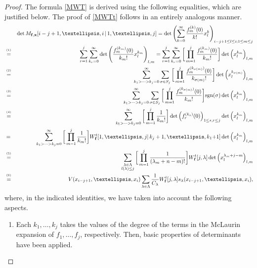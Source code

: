 \documentclass[10pt,a4paper]{amsart}
\begin{document}
\begin{proof}
The formula \eqref{MWT} is derived using the following equalities, which are justified below. The proof of \eqref{MWTt} follows  in an entirely analogous manner. 
    \begin{eqnarray*}
    &&\det M_{\bf f, \bf x}{[i-j+1,\dots,i\,|\,1,\dots, j]} =\det \left( \sum_{k=0}^\infty \frac{f_m^{(k)}(0)}{k!}x_l^{k}\right)_{i-j+1 \le l \le i; 1\le m \le j} \nonumber \\%
    &\stackrel{^{(1)}}{=}&{  \sum_{r=1}^j \sum_{k_r=0}^\infty \det\left(  \frac{f_m^{(k_m)}(0)}{k_m!}x_l^{k_m}\right)_{l,m}
    =\sum_{r=1}^j \sum_{k_r=0}^\infty   \bigg[\prod_{m=1}^j \frac{f_m^{(k_m)}(0)}{k_m!}\bigg]\det\left( x_l^{k_m}\right)_{l,m} }\\
    &\stackrel{^{(2)}}{=}&   \sum_{k_1>\cdots> k_j=0}^\infty \sum_{\sigma\in S_j} \bigg[\prod_{m=1}^j \frac{f_{m}^{(k_{\sigma(m)})}(0)}{k_{\sigma(m)}!}\bigg]\det\Big(x_l^{k_{\sigma(m)}}\Big)_{l,m}  \nonumber\\
    &\stackrel{^{(3)}}{=}&\sum_{k_1>\cdots> k_j=0}^\infty \sum_{\sigma\in S_j} \bigg[\prod_{m=1}^j \frac{f_m^{(k_{\sigma(m)})}(0)}{   k_{m}!}\bigg]\text{sgn}(\sigma)\det\Big(x_l^{k_m}\Big)_{l,m}\nonumber\\
    &\stackrel{^{(4)}}{=}&\sum_{k_1>\cdots> k_j=0}^\infty  \bigg[\prod_{m=1}^j \frac{1}{k_m!}\bigg]\det\Big(f_r^{(k_s)}(0)\Big)_{1\leq s,r\leq j}\det\Big(x_l^{k_m}\Big)_{l,m}\nonumber \\
    &=&\sum_{k_1>\cdots> k_j=0}^\infty  \bigg[\prod_{m=1}^j \frac{1}{k_m!}\bigg]W_{\bf f}^t{[1,\dots,j|\,k_j+1,\dots,k_1{  +1}]}\det\Big(x_l^{k_m}\Big)_{l,m}\nonumber \\
    &\stackrel{^{(5)}}{=}&\sum_{\substack{ \lambda\in\Lambda\\
    l(\lambda)\leq j}}  \bigg[\prod_{m=1}^j \frac{1}{(\lambda_m+n-m)!}\bigg]W^t_{{\bf f}}{[j,\lambda]}\det\Big(x_l^{\lambda_m+j-m}\Big)_{l,m}\nonumber \\
    &\stackrel{^{(6)}}{=}& V( x_{i-j+1},\dots,x_i) \sum_{\lambda\in \Lambda}\frac{1}{C_\lambda}W^t_{{\bf f}}{[j,\lambda]}s_{\lambda}(x_{i-j+1},\dots,x_i),
\end{eqnarray*}
where, in the indicated identities, we have taken into account the following aspects.
\begin{enumerate}
    \item[(1)] 
Each $k_1,\dots,k_j$ takes the values of the degree of the terms in the McLaurin expansion of $f_1,\ldots, f_j$, respectively.  Then,  basic properties of determinants have been applied. 
    

\end{enumerate}
\end{proof}
\end{document}
